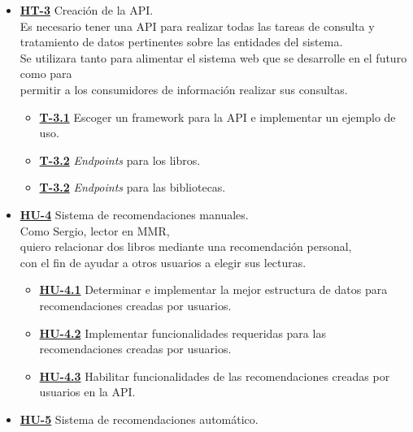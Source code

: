 \begin{itemize}
    \item \href{https://github.com/Anglepi/My-Many-Reads/issues/45}{\textbf{HT-3}} Creación de la API. \\
    Es necesario tener una API para realizar todas las tareas de consulta y tratamiento de datos pertinentes sobre las entidades del sistema. \\
    Se utilizara tanto para alimentar el sistema web que se desarrolle en el futuro como para \\
    permitir a los consumidores de información realizar sus consultas.
    \begin{itemize}
        \item \href{https://github.com/Anglepi/My-Many-Reads/issues/46}{\textbf{T-3.1}} Escoger un framework para la API e implementar un ejemplo de uso.
        \item \href{https://github.com/Anglepi/My-Many-Reads/issues/47}{\textbf{T-3.2}} \textit{Endpoints} para los libros.
        \item \href{https://github.com/Anglepi/My-Many-Reads/issues/48}{\textbf{T-3.2}} \textit{Endpoints} para las bibliotecas.
    \end{itemize}
    \item \href{https://github.com/Anglepi/My-Many-Reads/issues/49}{\textbf{HU-4}} Sistema de recomendaciones manuales. \\
    Como Sergio, lector en MMR, \\
    quiero relacionar dos libros mediante una recomendación personal, \\
    con el fin de ayudar a otros usuarios a elegir sus lecturas.
    \begin{itemize}
        \item \href{https://github.com/Anglepi/My-Many-Reads/issues/57}{\textbf{HU-4.1}} Determinar e implementar la mejor estructura de datos para recomendaciones creadas por usuarios.
        \item \href{https://github.com/Anglepi/My-Many-Reads/issues/58}{\textbf{HU-4.2}} Implementar funcionalidades requeridas para las recomendaciones creadas por usuarios.
        \item \href{https://github.com/Anglepi/My-Many-Reads/issues/59}{\textbf{HU-4.3}} Habilitar funcionalidades de las recomendaciones creadas por usuarios en la API.
    \end{itemize}
    \item \href{https://github.com/Anglepi/My-Many-Reads/issues/50}{\textbf{HU-5}} Sistema de recomendaciones automático. \\

\end{itemize}
